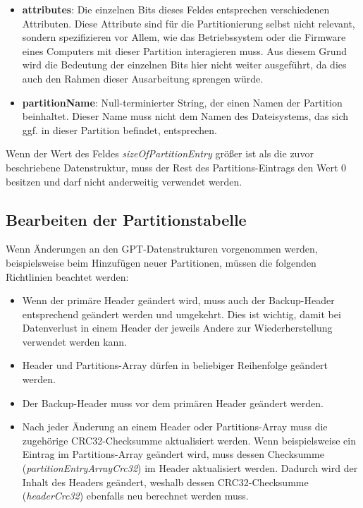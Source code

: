 \begin{itemize}
    \newpage
    \item \textbf{attributes}:
    Die einzelnen Bits dieses Feldes entsprechen verschiedenen Attributen.
    Diese Attribute sind für die Partitionierung selbst nicht relevant, sondern spezifizieren vor Allem, wie das Betriebssystem oder die Firmware eines Computers mit dieser Partition interagieren muss.
    Aus diesem Grund wird die Bedeutung der einzelnen Bits hier nicht weiter ausgeführt, da dies auch den Rahmen dieser Ausarbeitung sprengen würde.
    
    \item \textbf{partitionName}:
    Null-terminierter String, der einen Namen der Partition beinhaltet.
    Dieser Name muss nicht dem Namen des Dateisystems, das sich ggf. in dieser Partition befindet, entsprechen.

\end{itemize}

Wenn der Wert des Feldes \textit{sizeOfPartitionEntry} größer ist als die zuvor beschriebene Datenstruktur, muss der Rest des Partitions-Eintrags den Wert 0 besitzen und darf nicht anderweitig verwendet werden.\cite{uefi-spec}

\subsection{Bearbeiten der Partitionstabelle}
Wenn Änderungen an den GPT-Datenstrukturen vorgenommen werden, beispielsweise beim Hinzufügen neuer Partitionen, müssen die folgenden Richtlinien beachtet werden:

\begin{itemize}
    \item Wenn der primäre Header geändert wird, muss auch der Backup-Header entsprechend geändert werden und umgekehrt.
    Dies ist wichtig, damit bei Datenverlust in einem Header der jeweils Andere zur Wiederherstellung verwendet werden kann.

    \item Header und Partitions-Array dürfen in beliebiger Reihenfolge geändert werden.
    
    \item Der Backup-Header muss vor dem primären Header geändert werden.

    \item Nach jeder Änderung an einem Header oder Partitions-Array muss die zugehörige CRC32-Checksumme aktualisiert werden.
    Wenn beispielsweise ein Eintrag im Partitions-Array geändert wird, muss dessen Checksumme (\textit{partitionEntryArrayCrc32}) im Header aktualisiert werden.
    Dadurch wird der Inhalt des Headers geändert, weshalb dessen CRC32-Checksumme (\textit{headerCrc32}) ebenfalls neu berechnet werden muss.
\end{itemize}

